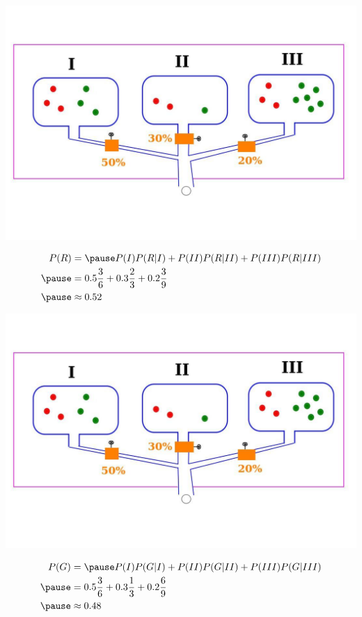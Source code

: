 \documentclass[12pt,aspectratio=169]{beamer}
\begin{document}
\begin{frame}
\begin{center}
\includegraphics[scale=0.3]{balls3}
\end{center}
\[
\begin{aligned}
P(R)&=\pause P(I)P(R|I)+P(II)P(R|II)+P(III)P(R|III)\\ \pause
&= 0.5\frac{3}{6}+0.3\frac{2}{3}+0.2\frac{3}{9}\\ \pause
&\approx 0.52
\end{aligned}
\]

\end{frame}


\begin{frame}
\begin{center}
\includegraphics[scale=0.3]{balls3}
\end{center}
\[
\begin{aligned}
P(G)&=\pause P(I)P(G|I)+P(II)P(G|II)+P(III)P(G|III)\\ \pause
&= 0.5\frac{3}{6}+0.3\frac{1}{3}+0.2\frac{6}{9}\\ \pause
&\approx 0.48
\end{aligned}
\]

\end{frame}
\end{document}
